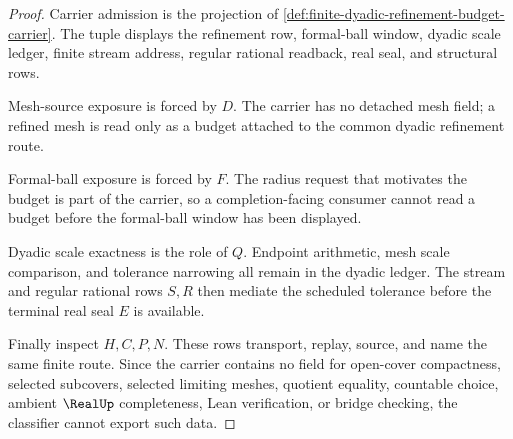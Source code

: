 \begin{proof}
Carrier admission is the projection of \autoref{def:finite-dyadic-refinement-budget-carrier}. The tuple displays the refinement row, formal-ball window, dyadic scale ledger, finite stream address, regular rational readback, real seal, and structural rows.

Mesh-source exposure is forced by $D$. The carrier has no detached mesh field; a refined mesh is read only as a budget attached to the common dyadic refinement route.

Formal-ball exposure is forced by $F$. The radius request that motivates the budget is part of the carrier, so a completion-facing consumer cannot read a budget before the formal-ball window has been displayed.

Dyadic scale exactness is the role of $Q$. Endpoint arithmetic, mesh scale comparison, and tolerance narrowing all remain in the dyadic ledger. The stream and regular rational rows $S,R$ then mediate the scheduled tolerance before the terminal real seal $E$ is available.

Finally inspect $H,C,P,N$. These rows transport, replay, source, and name the same finite route. Since the carrier contains no field for open-cover compactness, selected subcovers, selected limiting meshes, quotient equality, countable choice, ambient $\RealUp$ completeness, Lean verification, or bridge checking, the classifier cannot export such data.
\end{proof}

